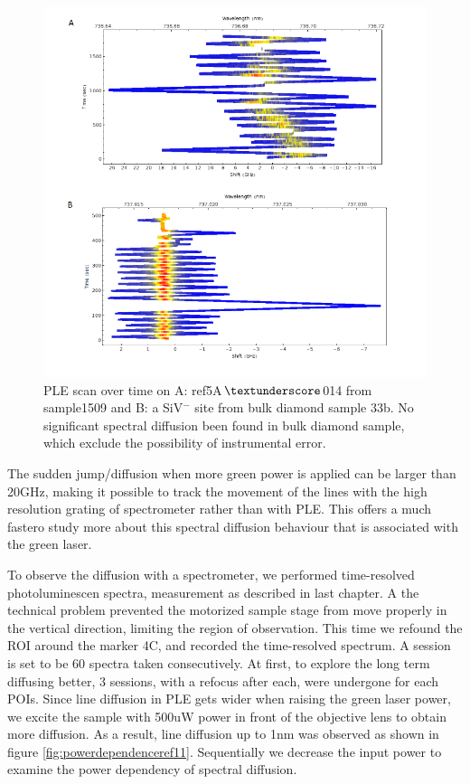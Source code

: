 \begin{figure}[t]
\centering
\includegraphics[width=0.7\linewidth]{Figures/pic/PLE}
\caption{PLE scan over time on A: ref5A$\textunderscore$014 from sample1509 and B: a SiV$^{-}$ site from bulk diamond sample 33b. No significant spectral diffusion been found in bulk diamond sample, which exclude the possibility of instrumental error.}
\label{fig:ple}
\end{figure}

The sudden jump/diffusion when more green power is applied can be larger than 20GHz, making it possible to track the movement of the lines with the high resolution grating of spectrometer rather than with PLE. This offers a much fastero study more about this spectral diffusion behaviour that is associated with the green laser. 

To observe the diffusion with a spectrometer, we performed time-resolved photoluminescen spectra, measurement as described in last chapter. A the technical problem prevented the motorized sample stage from move properly in the vertical direction, limiting the region of observation. This time we refound the ROI around the marker 4C, and recorded the time-resolved spectrum. A session is set to be 60 spectra taken consecutively. At first, to explore the long term diffusing better, 3 sessions, with a refocus after each, were undergone for each POIs. Since line diffusion in PLE gets wider when raising the green laser power, we excite the sample with 500uW power in front of the objective lens to obtain more diffusion. As a result, line diffusion up to 1nm was observed as shown in figure \ref{fig:powerdependenceref11}. Sequentially we decrease the input power to examine the power dependency of spectral diffusion.

